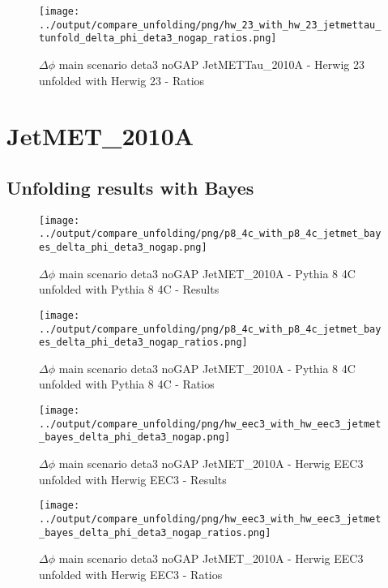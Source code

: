 \documentclass[11pt]{book}
\begin{document}
\begin{figure}[ht]
\centering
\texttt{[image: ../output/compare\_unfolding/png/hw\_23\_with\_hw\_23\_jetmettau\_tunfold\_delta\_phi\_deta3\_nogap\_ratios.png]}
\caption{$\Delta\phi$ main scenario deta3 noGAP JetMETTau\_2010A - Herwig 23 unfolded with Herwig 23 - Ratios}
\label{hw_23_hw_23_jetmettau_tunfold_delta_phi_deta3_nogap_b}
\end{figure}


\section{JetMET\_2010A}
\subsection{Unfolding results with Bayes}

\begin{figure}[ht]
\centering
\texttt{[image: ../output/compare\_unfolding/png/p8\_4c\_with\_p8\_4c\_jetmet\_bayes\_delta\_phi\_deta3\_nogap.png]}
\caption{$\Delta\phi$ main scenario deta3 noGAP JetMET\_2010A - Pythia 8 4C unfolded with Pythia 8 4C - Results}
\label{p8_p8_jetmet_bayes_delta_phi_deta3_nogap_a}
\end{figure}

\begin{figure}[ht]
\centering
\texttt{[image: ../output/compare\_unfolding/png/p8\_4c\_with\_p8\_4c\_jetmet\_bayes\_delta\_phi\_deta3\_nogap\_ratios.png]}
\caption{$\Delta\phi$ main scenario deta3 noGAP JetMET\_2010A - Pythia 8 4C unfolded with Pythia 8 4C - Ratios}
\label{p8_p8_jetmet_bayes_delta_phi_deta3_nogap_b}
\end{figure}

\begin{figure}[ht]
\centering
\texttt{[image: ../output/compare\_unfolding/png/hw\_eec3\_with\_hw\_eec3\_jetmet\_bayes\_delta\_phi\_deta3\_nogap.png]}
\caption{$\Delta\phi$ main scenario deta3 noGAP JetMET\_2010A - Herwig EEC3 unfolded with Herwig EEC3 - Results}
\label{hw_eec3_hw_eec3_jetmet_bayes_delta_phi_deta3_nogap_a}
\end{figure}

\begin{figure}[ht]
\centering
\texttt{[image: ../output/compare\_unfolding/png/hw\_eec3\_with\_hw\_eec3\_jetmet\_bayes\_delta\_phi\_deta3\_nogap\_ratios.png]}
\caption{$\Delta\phi$ main scenario deta3 noGAP JetMET\_2010A - Herwig EEC3 unfolded with Herwig EEC3 - Ratios}
\label{hw_eec3_hw_eec3_jetmet_bayes_delta_phi_deta3_nogap_b}
\end{figure}
\end{document}
